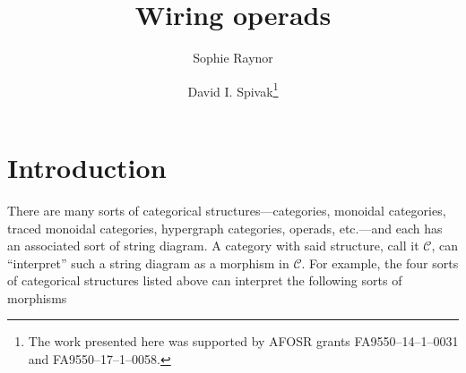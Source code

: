 \documentclass[11pt, article, oneside]{memoir}
\theoremstyle{plain}
\theoremstyle{definition}
\theoremstyle{remark}
\newcommand{\cat}[1]{\mathcal{#1}}
\begin{document}
\title{Wiring operads}

\author{
  Sophie Raynor
  \and 
  David I. Spivak\thanks{The work presented here was supported by AFOSR grants 
FA9550--14--1--0031 and FA9550--17--1--0058.}
}
\date{}

\maketitle

\chapter{Introduction}

There are many sorts of categorical structures---categories, monoidal categories, traced monoidal categories, hypergraph categories, operads, etc.---and each has an associated sort of string diagram. A category with said structure, call it $\cat{C}$, can ``interpret'' such a string diagram as a morphism in $\cat{C}$. For example, the four sorts of categorical structures listed above can interpret the following sorts of morphisms
\end{document}
